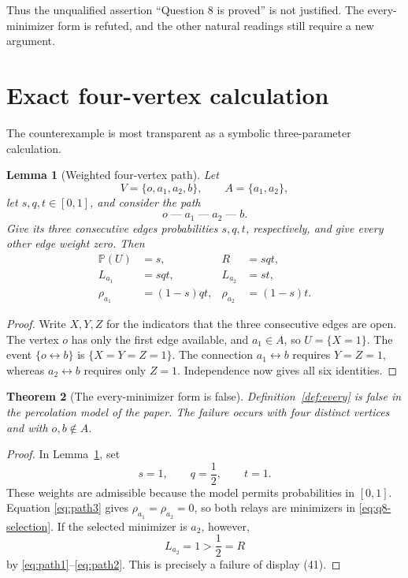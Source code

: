 \documentclass[11pt]{article}
\newtheorem{theorem}{Theorem}[section]
\newtheorem{lemma}[theorem]{Lemma}
\theoremstyle{definition}
\newcommand{\PP}{\mathbb P}
\newcommand{\con}{\leftrightarrow}
\newcommand{\1}{\mathbf 1}
\begin{document}
Thus the unqualified assertion ``Question 8 is proved'' is not justified.
The every-minimizer form is refuted, and the other natural readings still
require a new argument.

\section{Exact four-vertex calculation}

The counterexample is most transparent as a symbolic three-parameter
calculation.

\begin{lemma}[Weighted four-vertex path]\label{lem:path}
Let
\[
 V=\{o,a_1,a_2,b\},\qquad A=\{a_1,a_2\},
\]
let \(s,q,t\in[0,1]\), and consider the path
\[
 o\;\text{---}\;a_1\;\text{---}\;a_2\;\text{---}\;b.
\]
Give its three consecutive edges probabilities \(s,q,t\), respectively,
and give every other edge weight zero.  Then
\begin{align}
 \PP(U)&=s,                         & R&=sqt,\label{eq:path1}\\
 L_{a_1}&=sqt,                      & L_{a_2}&=st,\label{eq:path2}\\
 \rho_{a_1}&=(1-s)qt,              & \rho_{a_2}&=(1-s)t.\label{eq:path3}
\end{align}
\end{lemma}

\begin{proof}
Write \(X,Y,Z\) for the indicators that the three consecutive edges are
open.  The vertex \(o\) has only the first edge available, and \(a_1\in A\),
so \(U=\{X=1\}\).  The event \(\{o\con b\}\) is
\(\{X=Y=Z=1\}\).  The connection \(a_1\con b\) requires
\(Y=Z=1\), whereas \(a_2\con b\) requires only \(Z=1\).
Independence now gives all six identities.
\end{proof}

\begin{theorem}[The every-minimizer form is false]\label{thm:counterexample}
Definition~\ref{def:every} is false in the percolation model of the paper.
The failure occurs with four distinct vertices and with \(o,b\notin A\).
\end{theorem}

\begin{proof}
In Lemma~\ref{lem:path}, set
\[
 s=1,\qquad q=\frac12,\qquad t=1.
\]
These weights are admissible because the model permits probabilities in
\([0,1]\).  Equation \eqref{eq:path3} gives
\(\rho_{a_1}=\rho_{a_2}=0\), so both relays are minimizers in
\eqref{eq:q8-selection}.  If the selected minimizer is \(a_2\), however,
\[
 L_{a_2}=1>\frac12=R
\]
by \eqref{eq:path1}--\eqref{eq:path2}.  This is precisely a failure of
display (41).
\end{proof}
\end{document}
